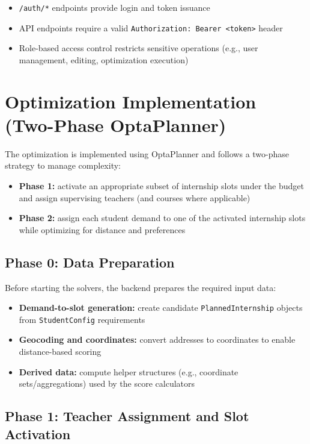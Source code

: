 \documentclass[12pt,a4paper]{report}
\begin{document}
\begin{itemize}
    \item \texttt{/auth/*} endpoints provide login and token issuance
    \item API endpoints require a valid \texttt{Authorization: Bearer <token>} header
    \item Role-based access control restricts sensitive operations (e.g., user management, editing, optimization execution)
\end{itemize}

\section{Optimization Implementation (Two-Phase OptaPlanner)}

The optimization is implemented using OptaPlanner and follows a two-phase strategy to manage complexity:

\begin{itemize}
    \item \textbf{Phase 1:} activate an appropriate subset of internship slots under the budget and assign supervising teachers (and courses where applicable)
    \item \textbf{Phase 2:} assign each student demand to one of the activated internship slots while optimizing for distance and preferences
\end{itemize}

\subsection{Phase 0: Data Preparation}

Before starting the solvers, the backend prepares the required input data:

\begin{itemize}
    \item \textbf{Demand-to-slot generation:} create candidate \texttt{PlannedInternship} objects from \texttt{StudentConfig} requirements
    \item \textbf{Geocoding and coordinates:} convert addresses to coordinates to enable distance-based scoring
    \item \textbf{Derived data:} compute helper structures (e.g., coordinate sets/aggregations) used by the score calculators
\end{itemize}

\subsection{Phase 1: Teacher Assignment and Slot Activation}
\end{document}
